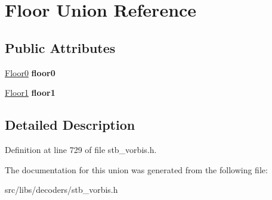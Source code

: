 \hypertarget{unionFloor}{\section{Floor Union Reference}
\label{unionFloor}
}
\subsection*{Public Attributes}
\begin{DoxyCompactItemize}
\item 
\hypertarget{unionFloor_a2330ff2cbd7ee66f38487546bbe03453}{\hyperlink{structFloor0}{Floor0} {\bfseries floor0}}\label{unionFloor_a2330ff2cbd7ee66f38487546bbe03453}

\item 
\hypertarget{unionFloor_adc1ac1b2639d665d8a7df65714a03f95}{\hyperlink{structFloor1}{Floor1} {\bfseries floor1}}\label{unionFloor_adc1ac1b2639d665d8a7df65714a03f95}

\end{DoxyCompactItemize}


\subsection{Detailed Description}


Definition at line 729 of file stb\-\_\-vorbis.\-h.



The documentation for this union was generated from the following file\-:\begin{DoxyCompactItemize}
\item 
src/libs/decoders/stb\-\_\-vorbis.\-h\end{DoxyCompactItemize}
